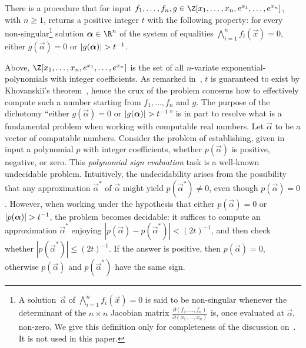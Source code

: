\begin{conjecture}
  \label{conjecture:WSC}
  There is a procedure that for input $f_1,\dots,f_n,g \in
  \Z[x_1,\dots,x_n,e^{x_1},\dots,e^{x_n}]$, with $n \geq 1$, returns a positive
  integer $t$ with the following property: for every non-singular\footnote{A
  solution~$\vec \alpha$ of $\bigwedge_{i=1}^nf_i(\vec x) = 0$ is said to be
  non-singular whenever the determinant of the $n \times n$ Jacobian matrix
  $\frac{\partial(f_1,\dots,f_n)}{\partial(x_1,\dots,x_n)}$ is, once evaluated
  at $\vec \alpha$, non-zero. We give this definition only for completeness of
  the discussion on~. It is not used in this paper.}
  solution $\vec \alpha \in \R^n$ of the system of equalities
  $\bigwedge_{i=1}^nf_i(\vec x) = 0$, either $g(\vec \alpha) = 0$ or
  $\left|g(\bm \alpha)\right| > t^{-1}$.
\end{conjecture}

\noindent
Above, $\Z[x_1,\dots,x_n,e^{x_1},\dots,e^{x_n}]$ is the set of all $n$-variate
exponential-polynomials with integer coefficients. As remarked
in~\cite{MacWilkie96}, $t$ is guaranteed to exist by Khovanskii's
theorem~\cite{Khovanskii91}, hence the crux of the problem concerns how
to effectively compute such a number starting from $f_1,\dots,f_n$ and $g$. 
The purpose of the dichotomy ``either $g(\vec \alpha) = 0$ or
${\left|g(\bm{\alpha})\right| > t^{-1}}$'' is in part to resolve what is a
fundamental problem when working with computable real numbers. Let
$\vec{\alpha}$ to be a vector of computable numbers. Consider the problem of
establishing, given in input a polynomial $p$ with integer coefficients, whether
$p(\vec{\alpha})$ is positive, negative, or zero. This \emph{polynomial sign
evaluation} task is a well-known undecidable problem. Intuitively, the
undecidability arises from the possibility that any approximation
$\vec{\alpha}^*$ of $\vec \alpha$ might yield $p(\vec{\alpha}^*) \neq 0$, even
though $p(\vec \alpha) = 0$. However, when working under the hypothesis that
either $p(\vec \alpha) = 0$ or $\left|p(\bm \alpha)\right| > t^{-1}$, the problem
becomes decidable: it suffices to compute an approximation $\vec \alpha^*$
enjoying $|p(\vec \alpha) - p(\vec{\alpha}^*)| < (2t)^{-1}$, and then check
whether $|p(\vec \alpha^*)| \leq (2t)^{-1}$. If the answer is positive, then
$p(\vec{\alpha}) = 0$, otherwise $p(\vec{\alpha})$ and $p(\vec \alpha^*)$ have
the same sign.

